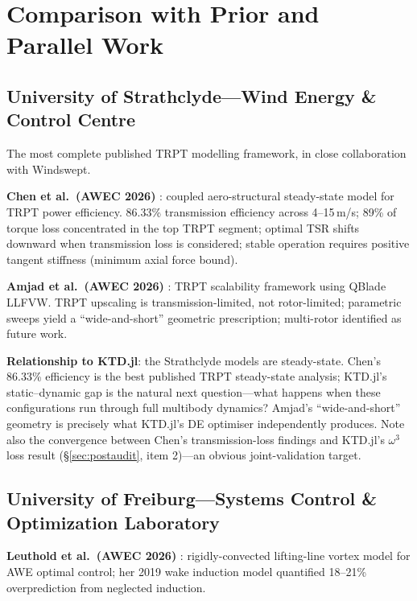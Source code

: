 \documentclass[11pt,a4paper]{article}
\begin{document}
\section{Comparison with Prior and Parallel Work}

\subsection{University of Strathclyde---Wind Energy \& Control Centre}

The most complete published TRPT modelling framework, in close collaboration with Windswept.

\textbf{Chen et al.\ (AWEC 2026)} \cite{chen2026}: coupled aero-structural steady-state model
for TRPT power efficiency.
86.33\% transmission efficiency across 4--15\,m/s; 89\% of torque loss concentrated in the
top TRPT segment; optimal TSR shifts downward when transmission loss is considered;
stable operation requires positive tangent stiffness (minimum axial force bound).

\textbf{Amjad et al.\ (AWEC 2026)} \cite{amjad2026}: TRPT scalability framework using
QBlade LLFVW.
TRPT upscaling is transmission-limited, not rotor-limited; parametric sweeps yield a
``wide-and-short'' geometric prescription; multi-rotor identified as future work.

\textbf{Relationship to KTD.jl}: the Strathclyde models are steady-state.
Chen's 86.33\% efficiency is the best published TRPT steady-state analysis;
KTD.jl's static--dynamic gap is the natural next question---what happens when these
configurations run through full multibody dynamics?
Amjad's ``wide-and-short'' geometry is precisely what KTD.jl's DE optimiser independently produces.
Note also the convergence between Chen's transmission-loss findings and KTD.jl's $\omega^3$ loss
result (\S\ref{sec:postaudit}, item 2)---an obvious joint-validation target.

\subsection{University of Freiburg---Systems Control \& Optimization Laboratory}

\textbf{Leuthold et al.\ (AWEC 2026)} \cite{leuthold2026}: rigidly-convected lifting-line
vortex model for AWE optimal control; her 2019 wake induction model \cite{leuthold2019}
quantified 18--21\% overprediction from neglected induction.
\end{document}
